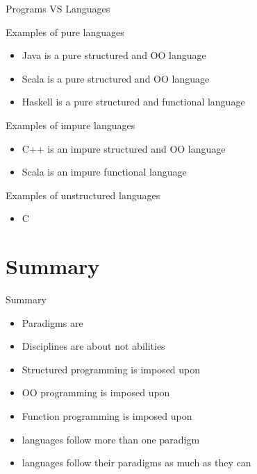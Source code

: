 \begin{frame}{Programs VS Languages}
\begin{exampleblock}{Examples of pure languages}
\begin{itemize}
  \item Java is a pure structured and OO language
  \item Scala is a pure structured and OO language
  \item Haskell is a pure structured and functional language
\end{itemize}
\end{exampleblock}
\pause
\begin{block}{Examples of impure languages}
\begin{itemize}
  \item C++ is an impure structured and OO language
  \item Scala is an impure functional language
\end{itemize}
\pause
\end{block}
\begin{alertblock}{Examples of unstructured languages}
\begin{itemize}
  \item C
\end{itemize}
\end{alertblock}
\end{frame}

\section{Summary}
\begin{frame}{Summary}
\begin{itemize}
  \item Paradigms are 
  \item Disciplines are about  not \alert{abilities}
  \item Structured programming is imposed upon 
  \item OO programming is imposed upon 
  \item Function programming is imposed upon 
  \item {} languages follow more than one paradigm
  \item {} languages follow their paradigms as much as they can
\end{itemize}
\end{frame}